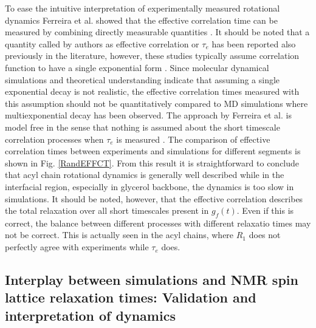 \documentclass[aps,prl,superscriptaddress,twocolumn]{revtex4}
\begin{document}
To ease the intuitive interpretation of experimentally measured rotational dynamics
Ferreira et al. showed that the effective correlation time can be measured by combining 
directly measurable quantities \cite{ferreira15}. It should be noted that a quantity called by 
authors as effective correlation or $\tau_e$ has been reported also previously in the 
literature, however, these studies typically assume correlation function to have a single
exponential form \cite{??}. Since molecular dynamical simulations and theoretical understanding
indicate that assuming a single exponential decay is not realistic, the effective correlation
times measured with this assumption should not be quantitatively compared to MD simulations
where multiexponential decay has been observed. The approach by Ferreira et al. is model
free in the sense that nothing is assumed about the short timescale correlation processes
when $\tau_e$ is measured \cite{ferreira15}. The comparison of effective correlation times
between experiments and simulations for different segments is shown in Fig. \ref{RandEFFCT}.
From this result it is straightforward to conclude that acyl chain rotational dynamics 
is generally well described while in the interfacial region, especially in glycerol backbone,
the dynamics is too slow in simulations. It should be noted, however, that the effective correlation
describes the total relaxation over all short timescales present in $g_f(t)$. Even if this is 
correct, the balance between different processes with different relaxatio times may not be
correct. This is actually seen in the acyl chains, where $R_1$ does not perfectly agree with
experiments while $\tau_e$ does.  



\subsection{Interplay between simulations and NMR spin lattice relaxation times: Validation and interpretation of dynamics}
\end{document}
